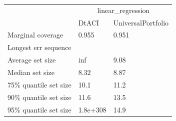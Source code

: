 \begin{tabular}{lll}
\toprule
& \multicolumn{2}{c}{linear_regression} \\
& DtACI & UniversalPortfolio \\
\midrule
Marginal coverage & 0.955 & 0.951 \\
Longest err sequence &  &  \\
Average set size & inf & 9.08 \\
Median set size & 8.32 & 8.87 \\
75\% quantile set size & 10.1 & 11.2 \\
90\% quantile set size & 11.6 & 13.5 \\
95\% quantile set size & 1.8e+308 & 14.9 \\
\bottomrule
\end{tabular}
